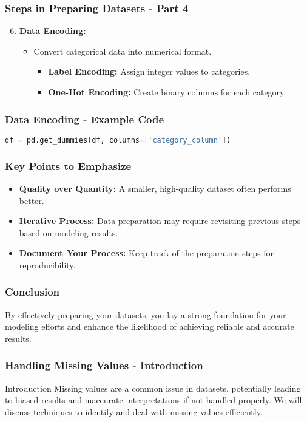 \documentclass[aspectratio=169]{beamer}
\begin{document}
\begin{frame}
    \frametitle{Steps in Preparing Datasets - Part 4}
    \begin{enumerate}
        \setcounter{enumi}{5} %
        \item \textbf{Data Encoding:}
        \begin{itemize}
            \item Convert categorical data into numerical format.
            \begin{itemize}
                \item \textbf{Label Encoding:} Assign integer values to categories.
                \item \textbf{One-Hot Encoding:} Create binary columns for each category.
            \end{itemize}
        \end{itemize}
    \end{enumerate}
\end{frame}

\begin{frame}[fragile]
    \frametitle{Data Encoding - Example Code}
    \begin{lstlisting}[language=Python]
    df = pd.get_dummies(df, columns=['category_column'])
    \end{lstlisting}
\end{frame}

\begin{frame}
    \frametitle{Key Points to Emphasize}
    \begin{itemize}
        \item \textbf{Quality over Quantity:} A smaller, high-quality dataset often performs better.
        \item \textbf{Iterative Process:} Data preparation may require revisiting previous steps based on modeling results.
        \item \textbf{Document Your Process:} Keep track of the preparation steps for reproducibility.
    \end{itemize}
\end{frame}

\begin{frame}
    \frametitle{Conclusion}
    By effectively preparing your datasets, you lay a strong foundation for your modeling efforts and enhance the likelihood of achieving reliable and accurate results.
\end{frame}

\begin{frame}
    \frametitle{Handling Missing Values - Introduction}
    \begin{block}{Introduction}
        Missing values are a common issue in datasets, potentially leading to biased results and inaccurate interpretations if not handled properly.
        We will discuss techniques to identify and deal with missing values efficiently.
    \end{block}
\end{frame}
\end{document}
